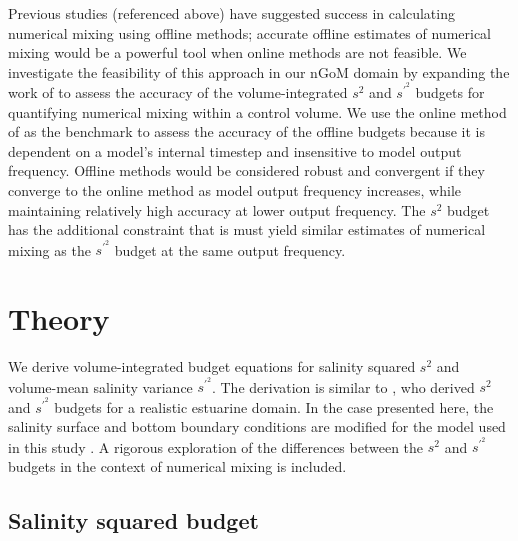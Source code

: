 Previous studies (referenced above) have suggested success in calculating numerical mixing using offline methods; accurate offline estimates of numerical mixing would be a powerful tool when online methods are not feasible. We investigate the feasibility of this approach in our nGoM domain by expanding the work of \citet{Wang_2021} to assess the accuracy of the volume-integrated $s^2$ and $s^{\prime^2}$ budgets for quantifying numerical mixing within a control volume. We use the online method of \citet{Burchard_2008} as the benchmark to assess the accuracy of the offline budgets because it is dependent on a model's internal timestep and insensitive to model output frequency. Offline methods would be considered robust and convergent if they converge to the online method as model output frequency increases, while maintaining relatively high accuracy at lower output frequency. The $s^2$ budget has the additional constraint that is must yield similar estimates of numerical mixing as the $s^{\prime^2}$ budget at the same output frequency. 

\section{Theory} \label{sec:theory}

We derive volume-integrated budget equations for salinity squared $s^2$ and volume-mean salinity variance $s^{\prime^2}$. The derivation is similar to \citet{Lorenz_2021}, who derived $s^2$ and $s^{\prime^2}$ budgets for a realistic estuarine domain. In the case presented here, the salinity surface and bottom boundary conditions are modified for the model used in this study \citep[Regional Ocean Modeling Systems, ROMS, ][]{shchepetkin2005regional}. A rigorous exploration of the differences between the $s^2$ and $s^{\prime^2}$ budgets in the context of numerical mixing is included. 

\subsection{Salinity squared budget}

